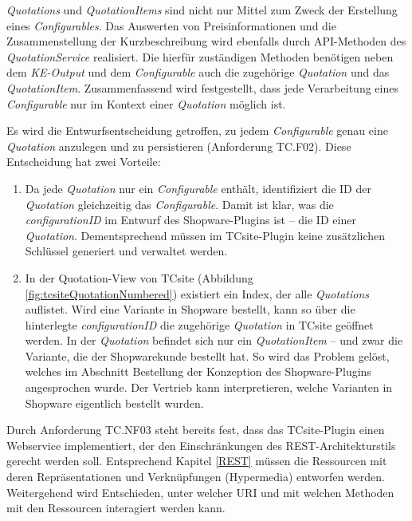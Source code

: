 \documentclass[11pt, a4paper, titlepage, listof=totoc, bibliography=totoc, index=totoc, twoside, openright, headings=normal]{scrreprt}
\begin{document}
\emph{Quotations} und \emph{QuotationItems} sind nicht nur Mittel zum Zweck der Erstellung eines \emph{Configurables}. Das Auswerten von Preisinformationen und die Zusammenstellung der Kurzbeschreibung wird ebenfalls durch API-Methoden des \emph{QuotationService} realisiert. Die hierfür zuständigen Methoden benötigen neben dem \emph{KE-Output} und dem \emph{Configurable} auch die zugehörige \emph{Quotation} und das \emph{QuotationItem}. Zusammenfassend wird festgestellt, dass jede Verarbeitung eines \emph{Configurable} nur im Kontext einer \emph{Quotation} möglich ist.

Es wird die Entwurfsentscheidung getroffen, zu jedem \emph{Configurable} genau eine \emph{Quotation} anzulegen und zu persistieren (Anforderung TC.F02). Diese Entscheidung hat zwei Vorteile:
\begin{enumerate}
\item Da jede \emph{Quotation} nur ein \emph{Configurable} enthält, identifiziert die ID der \emph{Quotation} gleichzeitig das \emph{Configurable}. Damit ist klar, was die \emph{configurationID} im Entwurf des Shopware-Plugins ist -- die ID einer \emph{Quotation}.  Dementsprechend müssen im TCsite-Plugin keine zusätzlichen Schlüssel generiert und verwaltet werden.
\item In der Quotation-View von TCsite (Abbildung \ref{fig:tcsiteQuotationNumbered}) existiert ein Index, der alle \emph{Quotations} auflistet. Wird eine Variante in Shopware bestellt, kann so über die hinterlegte \emph{configurationID} die zugehörige \emph{Quotation} in TCsite geöffnet werden. In der \emph{Quotation} befindet sich nur ein \emph{QuotationItem} -- und zwar die Variante, die der Shopwarekunde bestellt hat. So wird das Problem gelöst, welches im Abschnitt \glqq Bestellung\grqq{} der Konzeption des Shopware-Plugins angesprochen wurde. Der Vertrieb kann interpretieren, welche Varianten in Shopware eigentlich bestellt wurden.
\end{enumerate}

Durch Anforderung TC.NF03 steht bereits fest, dass das TCsite-Plugin einen Webservice implementiert, der den Einschränkungen des REST-Architekturstils gerecht werden soll. Entsprechend Kapitel \ref{REST} müssen die Ressourcen mit deren Repräsentationen und Verknüpfungen (Hypermedia) entworfen werden. Weitergehend wird Entschieden, unter welcher URI und mit welchen Methoden mit den Ressourcen interagiert werden kann.
\end{document}
